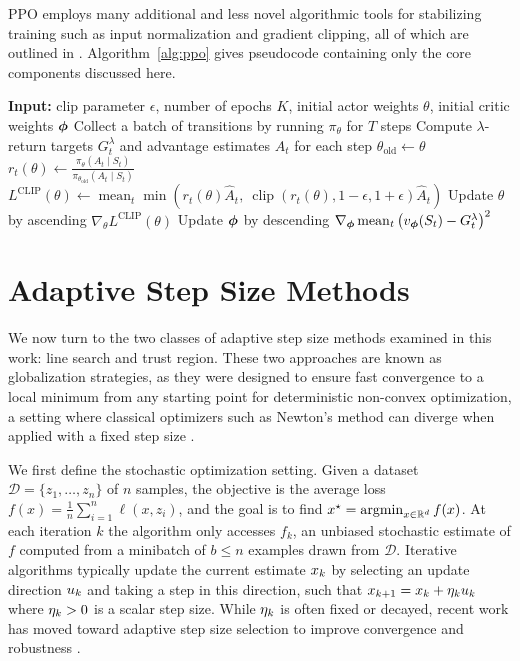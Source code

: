   PPO employs many additional and less novel algorithmic tools for stabilizing training such as input normalization and gradient clipping, all of which are outlined in . Algorithm~\ref{alg:ppo} gives pseudocode containing only the core components discussed here.
  
  \begin{algorithm}[t]
  \caption{Proximal Policy Optimization (PPO)}
  \label{alg:ppo}
  \begin{algorithmic}[1]
  \State \textbf{Input:} clip parameter $\epsilon$, number of epochs $K$, initial actor weights $\theta$, initial critic weights ${\bm \phi}$
      \State Collect a batch of transitions by running $\pi_\theta$ for $T$ steps
      \State Compute $\lambda$-return targets $G_t^\lambda$ and advantage estimates $\hat{A}_t$ for each step
      \State $\theta_{\text{old}} \gets \theta$
              \State $r_t(\theta) \gets \frac{\pi_\theta(A_t \mid S_t)}{\pi_{\theta_{\text{old}}}(A_t \mid S_t)}$
              \State $L^{\text{CLIP}}(\theta) \gets \operatorname{mean}_t \min\!\left( r_t(\theta) \hat{A}_t,\ \operatorname{clip}(r_t(\theta), 1-\epsilon, 1+\epsilon)\hat{A}_t \right)$
              \State Update $\theta$ by ascending $\nabla_\theta L^{\text{CLIP}}(\theta)$
              \State Update ${\bm \phi}$ by descending $\nabla_{{\bm \phi}} \operatorname{mean}_t \left( v_{\bm \phi}(S_t) - G_t^\lambda \right)^2$
          \EndFor
      \EndFor
  \EndFor
  \end{algorithmic}
  \end{algorithm}
  
  
  \section{Adaptive Step Size Methods}
  We now turn to the two classes of adaptive step size methods examined in this work: line search and trust region. These two approaches are known as globalization strategies, as they were designed to ensure fast convergence to a local minimum from any starting point for deterministic non-convex optimization, a setting where classical optimizers such as Newton's method can diverge when applied with a fixed step size . 
  
  We first define the stochastic optimization setting. Given a dataset $\mathcal{D} = \{z_1, \dots, z_n\}$ of $n$ samples, the objective is the average loss $f(x) = \frac{1}{n}\sum_{i=1}^{n} \ell(x, z_i)$, and the goal is to find $x^\star = \operatorname{argmin}_{x \in \mathbb{R}^d} f(x)$. At each iteration $k$ the algorithm only accesses $f_k$, an unbiased stochastic estimate of $f$ computed from a minibatch of $b \le n$ examples drawn from $\mathcal{D}$.
  Iterative algorithms typically update the current estimate $x_{k}$ by selecting an update direction $u_{k}$ and taking a step in this direction, such that $x_{k+1} = x_{k} + \eta_{k} u_{k}$ where $\eta_{k} > 0$ is a scalar step size. While $\eta_{k}$ is often fixed or decayed, recent work has moved toward adaptive step size selection to improve convergence and robustness . 
  
